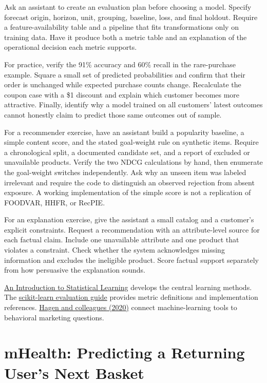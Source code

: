 \noindent Ask an assistant to create an evaluation plan before choosing a model.
Specify forecast origin, horizon, unit, grouping, baseline, loss, and
final holdout. Require a feature-availability table and a pipeline that
fits transformations only on training data. Have it produce both a
metric table and an explanation of the operational decision each metric
supports.

For practice, verify the 91\% accuracy and 60\% recall in the
rare-purchase example. Square a small set of predicted probabilities and
confirm that their order is unchanged while expected purchase counts
change. Recalculate the coupon case with a \$1 discount and explain
which customer becomes more attractive. Finally, identify why a model
trained on all customers' latest outcomes cannot honestly claim to
predict those same outcomes out of sample.

For a recommender exercise, have an assistant build a popularity
baseline, a simple content score, and the stated goal-weight rule on
synthetic items. Require a chronological split, a documented candidate
set, and a report of excluded or unavailable products. Verify the two
NDCG calculations by hand, then enumerate the goal-weight switches
independently. Ask why an unseen item was labeled irrelevant and require
the code to distinguish an observed rejection from absent exposure. A
working implementation of the simple score is not a replication of
FOODVAR, HHFR, or RecPIE.

For an explanation exercise, give the assistant a small catalog and a
customer's explicit constraints. Request a recommendation with an
attribute-level source for each factual claim. Include one unavailable
attribute and one product that violates a constraint. Check whether the
system acknowledges missing information and excludes the ineligible
product. Score factual support separately from how persuasive the
explanation sounds.

\href{https://www.statlearning.com/}{An Introduction to Statistical
Learning} develops the central learning methods. The
\href{https://scikit-learn.org/stable/modules/model_evaluation.html}{scikit-learn
evaluation guide} provides metric definitions and implementation
references. \href{https://doi.org/10.1007/s11002-020-09535-7}{Hagen and
colleagues (2020)} connect machine-learning tools to behavioral
marketing questions.

\hypertarget{M07-mhealth-predicting-a-returning-users-next-basket}{%
\section{mHealth: Predicting a Returning User's Next
Basket}\label{M07-mhealth-predicting-a-returning-users-next-basket}}

